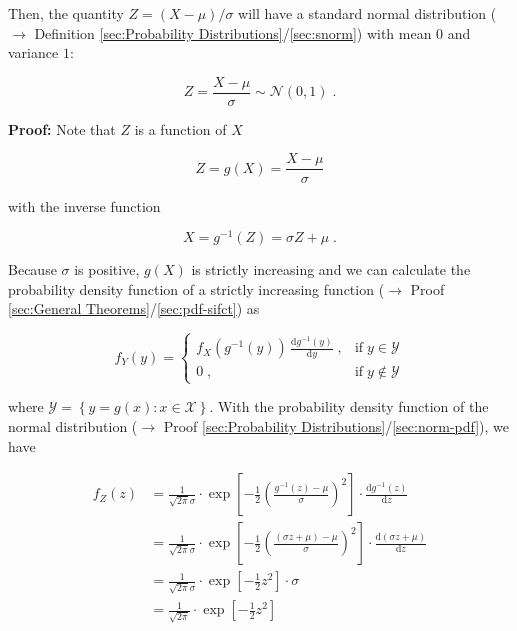 \documentclass[a4paper,12pt,twoside]{book}
\begin{document}
Then, the quantity $Z = (X-\mu)/\sigma$ will have a standard normal distribution ($\rightarrow$ Definition \ref{sec:Probability Distributions}/\ref{sec:snorm}) with mean $0$ and variance $1$:

\begin{equation} \label{eq:norm-snorm2-Z-snorm}
Z = \frac{X-\mu}{\sigma} \sim \mathcal{N}(0, 1) \; .
\end{equation}


\vspace{1em}
\textbf{Proof:} Note that $Z$ is a function of $X$

\begin{equation} \label{eq:norm-snorm2-Z-X}
Z = g(X) = \frac{X-\mu}{\sigma}
\end{equation}

with the inverse function

\begin{equation} \label{eq:norm-snorm2-X-Z}
X = g^{-1}(Z) = \sigma Z + \mu \; .
\end{equation}

Because $\sigma$ is positive, $g(X)$ is strictly increasing and we can calculate the probability density function of a strictly increasing function ($\rightarrow$ Proof \ref{sec:General Theorems}/\ref{sec:pdf-sifct}) as

\begin{equation} \label{eq:norm-snorm2-pdf-sifct}
f_Y(y) = \left\{
\begin{array}{rl}
f_X(g^{-1}(y)) \, \frac{\mathrm{d}g^{-1}(y)}{\mathrm{d}y} \; , & \text{if} \; y \in \mathcal{Y} \\
0 \; , & \text{if} \; y \notin \mathcal{Y}
\end{array}
\right.
\end{equation}

where $\mathcal{Y} = \left\lbrace y = g(x): x \in \mathcal{X} \right\rbrace$. With the probability density function of the normal distribution ($\rightarrow$ Proof \ref{sec:Probability Distributions}/\ref{sec:norm-pdf}), we have

\begin{equation} \label{eq:norm-snorm2-pdf-Z}
\begin{split}
f_Z(z) &= \frac{1}{\sqrt{2 \pi} \sigma} \cdot \exp \left[ -\frac{1}{2} \left( \frac{g^{-1}(z)-\mu}{\sigma} \right)^2 \right] \cdot \frac{\mathrm{d}g^{-1}(z)}{\mathrm{d}z} \\
&= \frac{1}{\sqrt{2 \pi} \sigma} \cdot \exp \left[ -\frac{1}{2} \left( \frac{(\sigma z + \mu)-\mu}{\sigma} \right)^2 \right] \cdot \frac{\mathrm{d}(\sigma z + \mu)}{\mathrm{d}z} \\
&= \frac{1}{\sqrt{2 \pi} \sigma} \cdot \exp \left[ -\frac{1}{2} z^2 \right] \cdot \sigma \\
&= \frac{1}{\sqrt{2 \pi}} \cdot \exp \left[ -\frac{1}{2} z^2 \right]
\end{split}
\end{equation}
\end{document}
